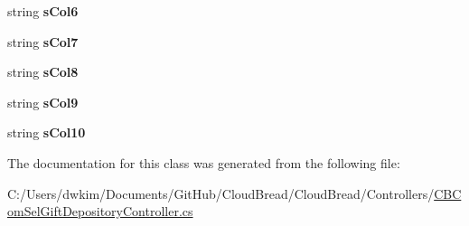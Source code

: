 \begin{DoxyCompactItemize}
\item 
string {\bfseries s\+Col6}\hypertarget{class_cloud_bread_1_1_controllers_1_1_c_b_com_sel_gift_depository_controller_1_1_model_ae0b5eabeff3beb77023b71fe466c15c0}{}\label{class_cloud_bread_1_1_controllers_1_1_c_b_com_sel_gift_depository_controller_1_1_model_ae0b5eabeff3beb77023b71fe466c15c0}

\item 
string {\bfseries s\+Col7}\hypertarget{class_cloud_bread_1_1_controllers_1_1_c_b_com_sel_gift_depository_controller_1_1_model_a4524a5435f5c96a953ca5e3d0c96ba6a}{}\label{class_cloud_bread_1_1_controllers_1_1_c_b_com_sel_gift_depository_controller_1_1_model_a4524a5435f5c96a953ca5e3d0c96ba6a}

\item 
string {\bfseries s\+Col8}\hypertarget{class_cloud_bread_1_1_controllers_1_1_c_b_com_sel_gift_depository_controller_1_1_model_a474214588d928ee0dc8939c5d75ce9c6}{}\label{class_cloud_bread_1_1_controllers_1_1_c_b_com_sel_gift_depository_controller_1_1_model_a474214588d928ee0dc8939c5d75ce9c6}

\item 
string {\bfseries s\+Col9}\hypertarget{class_cloud_bread_1_1_controllers_1_1_c_b_com_sel_gift_depository_controller_1_1_model_a4a4ff8930452477ab503f6ede17e0411}{}\label{class_cloud_bread_1_1_controllers_1_1_c_b_com_sel_gift_depository_controller_1_1_model_a4a4ff8930452477ab503f6ede17e0411}

\item 
string {\bfseries s\+Col10}\hypertarget{class_cloud_bread_1_1_controllers_1_1_c_b_com_sel_gift_depository_controller_1_1_model_a685d61fa24479a55c1c6aa41bcabfc6b}{}\label{class_cloud_bread_1_1_controllers_1_1_c_b_com_sel_gift_depository_controller_1_1_model_a685d61fa24479a55c1c6aa41bcabfc6b}

\end{DoxyCompactItemize}


The documentation for this class was generated from the following file\+:\begin{DoxyCompactItemize}
\item 
C\+:/\+Users/dwkim/\+Documents/\+Git\+Hub/\+Cloud\+Bread/\+Cloud\+Bread/\+Controllers/\hyperlink{_c_b_com_sel_gift_depository_controller_8cs}{C\+B\+Com\+Sel\+Gift\+Depository\+Controller.\+cs}\end{DoxyCompactItemize}

